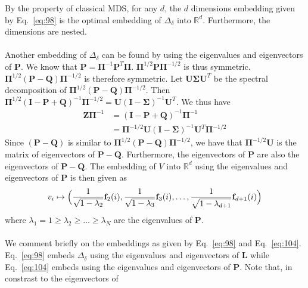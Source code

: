 By the property of classical MDS, for any $d$, the $d$ dimensions
embedding given by Eq.~\eqref{eq:98} is the optimal embedding of
$\Delta_\delta$ into $\mathbb{R}^{d}$. Furthermore, the
dimensions are nested. \\ \\
% 
%
\noindent Another embedding of $\Delta_\delta$ can be found by using
the eigenvalues and eigenvectors of $\mathbf{P}$. We know that
$\mathbf{P} = \bm{\Pi}^{-1}\mathbf{P}^{T}\bm{\Pi}$.
$\bm{\Pi}^{1/2}\mathbf{P}\bm{\Pi}^{-1/2}$ is thus symmetric. 
$\bm{\Pi}^{1/2}(\mathbf{P} - \mathbf{Q})\bm{\Pi}^{-1/2}$ is therefore
symmetric. Let $\mathbf{U}\bm{\Sigma}\mathbf{U}^{T}$ be the spectral
decomposition of $\bm{\Pi}^{1/2}(\mathbf{P} -
\mathbf{Q})\bm{\Pi}^{-1/2}$. Then $\bm{\Pi}^{1/2}(\mathbf{I} -
\mathbf{P} + \mathbf{Q})^{-1}\bm{\Pi}^{-1/2} = \mathbf{U}(\mathbf{I} -
\bm{\Sigma})^{-1}\mathbf{U}^{T}$. We thus have
\begin{equation}
  \label{eq:105}
  \begin{split}
  \mathbf{Z}\bm{\Pi}^{-1} &=  (\mathbf{I} - \mathbf{P} +
  \mathbf{Q})^{-1}\bm{\Pi}^{-1} \\ 
  &= \bm{\Pi}^{-1/2} \mathbf{U}(\mathbf{I} -
  \bm{\Sigma})^{-1}\mathbf{U}^{T}\bm{\Pi}^{-1/2} 
  \end{split}
\end{equation}
Since $(\mathbf{P} - \mathbf{Q})$ is similar to
$\bm{\Pi}^{1/2}(\mathbf{P} - \mathbf{Q})\bm{\Pi}^{-1/2}$, we have
that $\bm{\Pi}^{-1/2}\mathbf{U}$ is the matrix of eigenvectors of
$\mathbf{P} - \mathbf{Q}$. Furthermore, the eigenvectors of
$\mathbf{P}$ are also the eigenvectors of $\mathbf{P} - \mathbf{Q}$. 
The embedding of $V$ into $\mathbb{R}^{d}$ using the eigenvalues and
eigenvectors of $\mathbf{P}$ is then given as
\begin{equation}
  \label{eq:104}
  v_i \mapsto \Bigl( \frac{1}{\sqrt{1 - \lambda_2}} \mathbf{f}_2(i),
    \frac{1}{\sqrt{1 - \lambda_3}}\mathbf{f}_3(i), \dots, \frac{1}{\sqrt{1 -
          \lambda_{d+1}}} \mathbf{f}_{d+1}(i) \Bigr)
\end{equation}
where $\lambda_1 = 1 \geq \lambda_2 \geq \dots \geq \lambda_N$ are the
eigenvalues of $\mathbf{P}$. \\ \\
%
%
\noindent
We comment briefly on the embeddings as given by Eq.~\eqref{eq:98} and
Eq.~\eqref{eq:104}. Eq.~\eqref{eq:98} embeds $\Delta_{\delta}$ using
the eigenvalues and eigenvectors of $\mathbf{L}$ while
Eq.~\eqref{eq:104} embeds using the eigenvalues and eigenvectors of
$\mathbf{P}$. Note that, in constrast to the eigenvectors of
